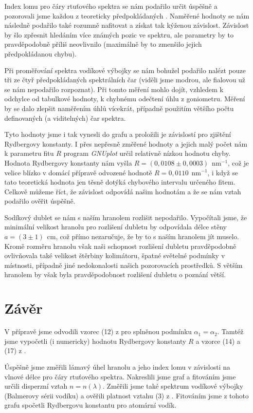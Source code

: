 \documentclass[english]{article}
\newcommand{\unit}[1]{\ \mathrm{#1}}
\begin{document}
		Index lomu pro čáry rtuťového spektra se nám podařilo určit úspěšně a pozorovali jsme každou z teoreticky předpokládaných \cite{bib:na_miste}. Naměřené hodnoty se nám následně podařilo také rozumně nafitovat a získat tak kýženou závislost. Závislost by šlo zpřesnit hledáním více známých pozic ve spektru, ale parametry by to pravděpodobně příliš neovlivnilo (maximálně by to zmenšilo jejich předpokládanou chybu).
		
		Při proměřování spektra vodíkové výbojky se nám bohužel podařilo nalézt pouze tři ze čtyř předpokládaných spektrálních čar (viděli jsme modrou, ale fialovou už se nám nepodařilo rozpoznat). Při tomto měření mohlo dojít, vzhledem k odchylce od tabulkové hodnoty, k chybnému odečtení úhlu z goniometru. Měření by se dalo zlepšit naměřením úhlů vícekrát, případně použitím většího počtu definovaných (a viditelných) čar spektra.
		
		Tyto hodnoty jsme i tak vynesli do grafu a proložili je závislostí pro zjištění Rydbergovy konstanty. I přes nepřesně změřené hodnoty a jejich malý počet nám k parametru fitu $R$ program \emph{GNUplot} určil relativně nízkou hodnotu chyby. Hodnota Rydbergovy konstanty nám vyšla $R = ( 0,0108\pm0,0003 )~\unit{ nm^{-1} }$, což je velice blízko v domácí přípravě odvozené hodnotě  $R = 0,0110~\unit{ nm^{-1} }$, i když se tato teoretická hodnota jen těsně dotýká chybového intervalu určeného fitem. Celkově můžeme říct, že závislost odpovídá našim hodnotám a že se nám vztah podařilo ověřit úspěšně.
		
		Sodíkový dublet se nám s naším hranolem rozlišit nepodařilo. Vypočítali jsme, že minimální velikost hranolu pro rozlišení dubletu by odpovídala délce stěny $a=(3\pm1)~\unit{cm}$, což přímo nezaručuje, že by to s naším hranolem jít muselo. Kromě rozměru hranolu však naši schopnost rozlišení dubletu pravděpodobně ovlivňovala také velikost štěrbiny kolimátoru, špatné světelné podmínky v místnosti, případně jiné nedokonalosti našich pozorovacích prostředků. S větším hranolem by však byla pravděpodobnost rozlišení dubletu o poznání větší.
		
\section{Závěr}
	V přípravě jsme odvodili vzorec (12) z \cite{bib:zadani} pro splněnou podmínku $\alpha_1=\alpha_2$. Tamtéž jsme vypočetli (i numericky) hodnotu Rydbergovy konstanty $R$ a vzorce (14) a (17) z \cite{bib:zadani}. 
	
	Úspěšně jsme změřili lámavý úhel hranolu a jeho index lomu v závislosti na vlnové délce pro čáry rtuťového spektra. Nakreslili jsme graf a fitováním jsme určili disperzní vztah $n=n(\lambda)$. Změřili jsme také spektrum vodíkové výbojky (Balmerovy sérii vodíku) a ověřili platnost vztahu (3) z \cite{bib:zadani}. Fitováním jsme z tohoto grafu spočetli Rydbergovu konstantu pro atomární vodík.
	
\end{document}
